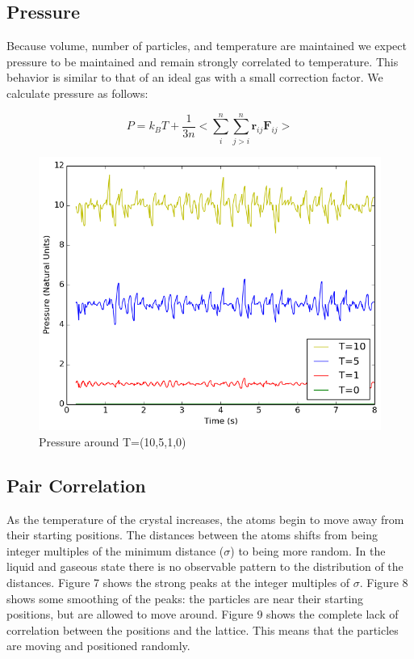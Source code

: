 \documentclass[10pt]{article}
\newcommand{\beq}{\begin{equation}}
\newcommand{\eeq}{\end{equation}}
\begin{document}
\subsection{Pressure}
Because volume, number of particles, and temperature are maintained we expect pressure to be maintained and remain strongly correlated to temperature.  This behavior is similar to that of an ideal gas with a small correction factor.  We calculate pressure as follows: 

\beq
\label{eqn:equation11}
P = k_BT + \frac{1}{3n}<\sum\limits_{i}^n\sum\limits_{j>i}^n\textbf{r}_{ij}\textbf{F}_{ij}>
\eeq

\begin{figure}[ht]
\centering
\begin{minipage}{.45\textwidth}
\centering
\includegraphics[width=1 \linewidth]{figures/pressure.png}
\caption{Pressure around T=(10,5,1,0)}
\label{fig:figure6}
\end{minipage}\hfill
\end{figure}

\subsection{Pair Correlation}
As the temperature of the crystal increases, the atoms begin to move away from their starting positions.  The distances between the atoms shifts from being integer multiples of the minimum distance ($\sigma$) to being more random.  In the liquid and gaseous state there is no observable pattern to the distribution of the distances.
Figure 7 shows the strong peaks at the integer multiples of $\sigma$.  Figure 8 shows some smoothing of the peaks: the particles are near their starting positions, but are allowed to move around.  Figure 9 shows the complete lack of correlation between the positions and the lattice.  This means that the particles are moving and positioned randomly. 
\end{document}
